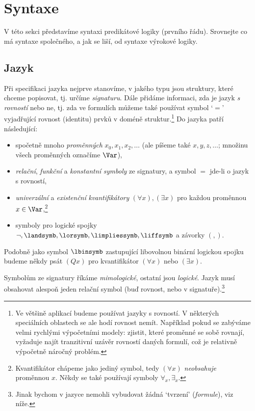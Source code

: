 
\section{Syntaxe}

V této sekci představíme syntaxi predikátové logiky (prvního řádu). Srovnejte co má syntaxe společného, a jak se liší, od syntaxe výrokové logiky.


\subsection{Jazyk}

Při specifikaci jazyka nejprve stanovíme, v jakého typu jsou struktury, které chceme popisovat, tj. určíme \emph{signaturu}. Dále přidáme informaci, zda je jazyk \emph{s rovností} nebo ne, tj. zda ve formulích můžeme také používat symbol `$=$' vyjadřující rovnost (identitu) prvků v doméně struktur.\footnote{Ve většině aplikací budeme používat jazyky s rovností. V některých speciálních oblastech se ale hodí rovnost nemít. Například pokud se zabýváme velmi rychlými výpočetními modely: zjistit, které proměnné se sobě rovnají, vyžaduje najít tranzitivní uzávěr rovností daných formulí, což je relativně výpočetně náročný problém.} Do jazyka patří následující:
\begin{itemize}
    \item spočetně mnoho \emph{proměnných} $x_0,x_1,x_2,\dots$ (ale píšeme také $x,y,z,\dots$; množinu všech proměnných označíme $\Var$),
    \item \emph{relační}, \emph{funkční} a \emph{konstantní symboly} ze signatury, a symbol $=$ jde-li o jazyk s rovností,
    \item \emph{univerzální} a \emph{existenční} \emph{kvantifikátory} $(\forall x),(\exists x)$ pro každou proměnnou $x\in\Var$,\footnote{Kvantifikátor chápeme jako jediný symbol, tedy $(\forall x)$ \emph{neobsahuje} proměnnou $x$. Někdy se také používají symboly $\forall_x,\exists_x$.}
    \item symboly pro logické spojky \( \neg,\landsymb,\lorsymb, \limpliessymb, \liffsymb \) a závorky \( (,) \).
\end{itemize}
Podobně jako symbol $\lbinsymb$ zastupující libovolnou binární logickou spojku budeme někdy psát $(Qx)$ pro kvantifikátor $(\forall x)$ nebo $(\exists x)$.

Symbolům ze signatury říkáme \emph{mimologické}, ostatní jsou \emph{logické}. Jazyk musí obsahovat alespoň jeden relační symbol (buď rovnost, nebo v signatuře).\footnote{Jinak bychom v jazyce nemohli vybudovat žádná `tvrzení' (\emph{formule}), viz níže.}

